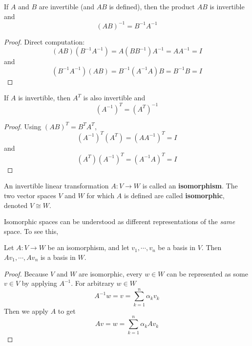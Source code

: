 \begin{theorem}
If $A$ and $B$ are invertible (and $AB$ is defined), then the product $AB$ is invertible and 
$$(AB)^{-1} = B^{-1} A^{-1}$$
\end{theorem}

\begin{proof}
Direct computation:
$$(AB)(B^{-1}A^{-1}) = A(BB^{-1})A^{-1} = AA^{-1} = I$$
and 
$$(B^{-1}A^{-1})(AB) = B^{-1}(A^{-1}A)B = B^{-1}B = I$$
\end{proof}

\begin{theorem}
If $A$ is invertible, then $A^{T}$ is also invertible and 
$$(A^{-1})^{T} = (A^{T})^{-1}$$
\end{theorem}

\begin{proof}
Using $(AB)^{T} = B^{T} A^{T}$, 
$$(A^{-1})^{T} (A^{T}) = (AA^{-1})^{T} = I$$
and 
$$(A^{T})(A^{-1})^{T} = (A^{-1}A)^{T} = I$$
\end{proof}

\begin{definition}
An invertible linear transformation $A: V \rightarrow W$ is called an \textbf{isomorphism}. The two vector spaces $V$ and $W$ for which $A$ is defined are called \textbf{isomorphic}, denoted $V \cong W$. 
\end{definition}

Isomorphic spaces can be understood as different representations of the \textit{same} space. To see this, 
\begin{theorem}
Let $A : V \rightarrow W$ be an isomorphism, and let $v_{1}, \cdots, v_{n}$ be a basis in $V$. Then $Av_{1}, \cdots, Av_{n}$ is a basis in $W$. 
\end{theorem}

\begin{proof}
Because $V$ and $W$ are isomorphic, every $w \in W$ can be represented as some $v \in V$ by applying $A^{-1}$. For arbitrary $w \in W$
$$A^{-1}w = v = \sum_{k=1}^{n} \alpha_{k} v_{k}$$
Then we apply $A$ to get 
$$Av = w = \sum_{k=1}^{n} \alpha_{k} Av_{k}$$
\end{proof}